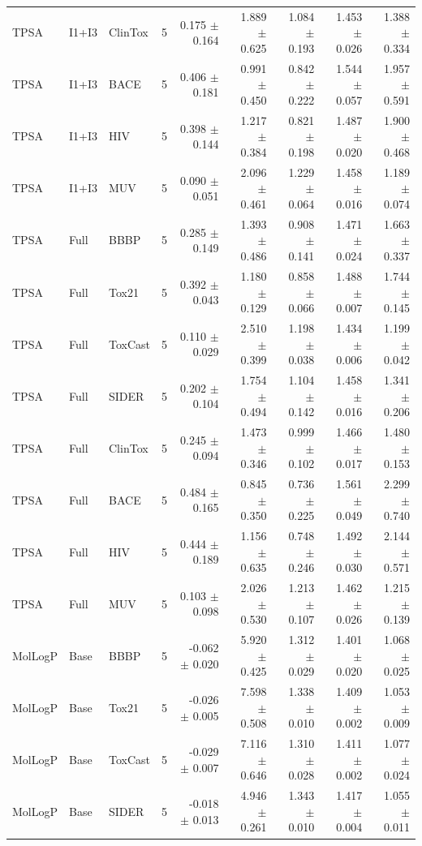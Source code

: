 \documentclass[journal=jcisd8,manuscript=article]{achemso}
\newcommand{\MolLogP}{MolLogP}
\begin{document}
\begin{landscape}
\begin{longtable}{lllrrrrrr}
TPSA & I1+I3 & ClinTox & 5 & 0.175 $\pm$ 0.164 & 1.889 $\pm$ 0.625 & 1.084 $\pm$ 0.193 & 1.453 $\pm$ 0.026 & 1.388 $\pm$ 0.334 \\
TPSA & I1+I3 & BACE & 5 & 0.406 $\pm$ 0.181 & 0.991 $\pm$ 0.450 & 0.842 $\pm$ 0.222 & 1.544 $\pm$ 0.057 & 1.957 $\pm$ 0.591 \\
TPSA & I1+I3 & HIV & 5 & 0.398 $\pm$ 0.144 & 1.217 $\pm$ 0.384 & 0.821 $\pm$ 0.198 & 1.487 $\pm$ 0.020 & 1.900 $\pm$ 0.468 \\
TPSA & I1+I3 & MUV & 5 & 0.090 $\pm$ 0.051 & 2.096 $\pm$ 0.461 & 1.229 $\pm$ 0.064 & 1.458 $\pm$ 0.016 & 1.189 $\pm$ 0.074 \\
TPSA & Full & BBBP & 5 & 0.285 $\pm$ 0.149 & 1.393 $\pm$ 0.486 & 0.908 $\pm$ 0.141 & 1.471 $\pm$ 0.024 & 1.663 $\pm$ 0.337 \\
TPSA & Full & Tox21 & 5 & 0.392 $\pm$ 0.043 & 1.180 $\pm$ 0.129 & 0.858 $\pm$ 0.066 & 1.488 $\pm$ 0.007 & 1.744 $\pm$ 0.145 \\
TPSA & Full & ToxCast & 5 & 0.110 $\pm$ 0.029 & 2.510 $\pm$ 0.399 & 1.198 $\pm$ 0.038 & 1.434 $\pm$ 0.006 & 1.199 $\pm$ 0.042 \\
TPSA & Full & SIDER & 5 & 0.202 $\pm$ 0.104 & 1.754 $\pm$ 0.494 & 1.104 $\pm$ 0.142 & 1.458 $\pm$ 0.016 & 1.341 $\pm$ 0.206 \\
TPSA & Full & ClinTox & 5 & 0.245 $\pm$ 0.094 & 1.473 $\pm$ 0.346 & 0.999 $\pm$ 0.102 & 1.466 $\pm$ 0.017 & 1.480 $\pm$ 0.153 \\
TPSA & Full & BACE & 5 & 0.484 $\pm$ 0.165 & 0.845 $\pm$ 0.350 & 0.736 $\pm$ 0.225 & 1.561 $\pm$ 0.049 & 2.299 $\pm$ 0.740 \\
TPSA & Full & HIV & 5 & 0.444 $\pm$ 0.189 & 1.156 $\pm$ 0.635 & 0.748 $\pm$ 0.246 & 1.492 $\pm$ 0.030 & 2.144 $\pm$ 0.571 \\
TPSA & Full & MUV & 5 & 0.103 $\pm$ 0.098 & 2.026 $\pm$ 0.530 & 1.213 $\pm$ 0.107 & 1.462 $\pm$ 0.026 & 1.215 $\pm$ 0.139 \\
\MolLogP & Base & BBBP & 5 & -0.062 $\pm$ 0.020 & 5.920 $\pm$ 0.425 & 1.312 $\pm$ 0.029 & 1.401 $\pm$ 0.020 & 1.068 $\pm$ 0.025 \\
\MolLogP & Base & Tox21 & 5 & -0.026 $\pm$ 0.005 & 7.598 $\pm$ 0.508 & 1.338 $\pm$ 0.010 & 1.409 $\pm$ 0.002 & 1.053 $\pm$ 0.009 \\
\MolLogP & Base & ToxCast & 5 & -0.029 $\pm$ 0.007 & 7.116 $\pm$ 0.646 & 1.310 $\pm$ 0.028 & 1.411 $\pm$ 0.002 & 1.077 $\pm$ 0.024 \\
\MolLogP & Base & SIDER & 5 & -0.018 $\pm$ 0.013 & 4.946 $\pm$ 0.261 & 1.343 $\pm$ 0.010 & 1.417 $\pm$ 0.004 & 1.055 $\pm$ 0.011 \\

\end{longtable}
\end{landscape}
\end{document}
